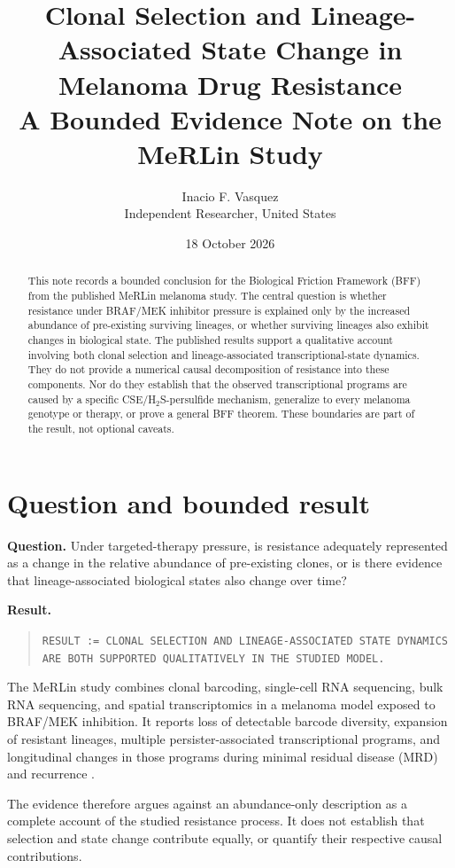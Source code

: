 \documentclass[11pt]{article}
\title{Clonal Selection and Lineage-Associated State Change in Melanoma Drug Resistance\\
\large A Bounded Evidence Note on the MeRLin Study}
\author{Inacio F. Vasquez\\Independent Researcher, United States}
\date{18 October 2026}
\begin{document}
\maketitle

\begin{abstract}
This note records a bounded conclusion for the Biological Friction Framework (BFF) from the published MeRLin melanoma study. The central question is whether resistance under BRAF/MEK inhibitor pressure is explained only by the increased abundance of pre-existing surviving lineages, or whether surviving lineages also exhibit changes in biological state. The published results support a qualitative account involving both clonal selection and lineage-associated transcriptional-state dynamics. They do not provide a numerical causal decomposition of resistance into these components. Nor do they establish that the observed transcriptional programs are caused by a specific CSE/H$_2$S-persulfide mechanism, generalize to every melanoma genotype or therapy, or prove a general BFF theorem. These boundaries are part of the result, not optional caveats.
\end{abstract}

\section{Question and bounded result}

\textbf{Question.} Under targeted-therapy pressure, is resistance adequately represented as a change in the relative abundance of pre-existing clones, or is there evidence that lineage-associated biological states also change over time?

\textbf{Result.}
\begin{quote}
\texttt{RESULT := CLONAL SELECTION AND LINEAGE-ASSOCIATED STATE DYNAMICS ARE BOTH SUPPORTED QUALITATIVELY IN THE STUDIED MODEL.}
\end{quote}

The MeRLin study combines clonal barcoding, single-cell RNA sequencing, bulk RNA sequencing, and spatial transcriptomics in a melanoma model exposed to BRAF/MEK inhibition. It reports loss of detectable barcode diversity, expansion of resistant lineages, multiple persister-associated transcriptional programs, and longitudinal changes in those programs during minimal residual disease (MRD) and recurrence \cite{Li2026}.

The evidence therefore argues against an abundance-only description as a complete account of the studied resistance process. It does not establish that selection and state change contribute equally, or quantify their respective causal contributions.
\end{document}
